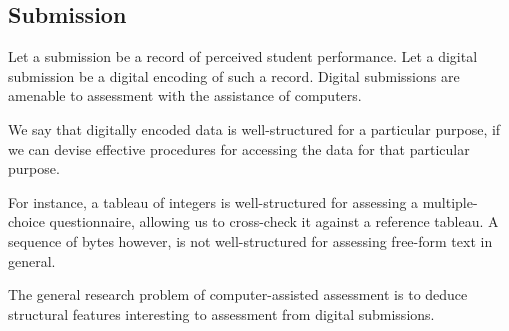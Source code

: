 \subsection{Submission}

Let a submission be a record of perceived student performance. Let a digital
submission be a digital encoding of such a record. Digital submissions are
amenable to assessment with the assistance of computers.

We say that digitally encoded data is well-structured for a particular purpose,
if we can devise effective procedures for accessing the data for that
particular purpose.

For instance, a tableau of integers is well-structured for assessing a
multiple-choice questionnaire, allowing us to cross-check it against a
reference tableau. A sequence of bytes however, is not well-structured for
assessing free-form text in general\cite{valenti-et-al-2003}. 

The general research problem of computer-assisted assessment is to deduce
structural features interesting to assessment from digital submissions.













